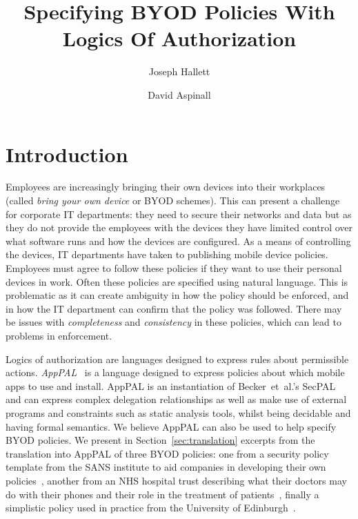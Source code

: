 \documentclass{easychair}
\title{Specifying BYOD Policies With Logics Of Authorization}
\author{
  Joseph Hallett\inst{1}
  \and
  David Aspinall\inst{1}
}
\institute{
  University of Edinburgh
}
\begin{document}
\maketitle

\begin{abstract}
\end{abstract}

\section{Introduction}

Employees are increasingly bringing their own devices into their workplaces (called \emph{bring your own device} or BYOD schemes).
This can present a challenge for corporate IT departments:
  they need to secure their networks and data but as they do not provide the employees with the devices they have limited control over what software runs and how the devices are configured.
As a means of controlling the devices, IT departments have taken to publishing mobile device policies.
Employees must agree to follow these policies if they want to use their personal devices in work.
Often these policies are specified using natural language.
This is problematic as it can create ambiguity in how the policy should be enforced, and in how the IT department can confirm that the policy was followed.
There may be issues with \emph{completeness} and \emph{consistency} in these policies, which can lead to problems in enforcement.

Logics of authorization are languages designed to express rules about permissible actions.
\emph{AppPAL}~\cite{Hallett:2016vu} is a language designed to express policies about which mobile apps to use and install.
AppPAL is an instantiation of Becker~et~al{.}'s SecPAL~\cite{Becker:2006vh} and can express complex delegation relationships as well as make use of external programs and constraints such as static analysis tools, whilst being decidable and having formal semantics.
We believe AppPAL can also be used to help specify BYOD policies. 
We present in Section~\ref{sec:translation} excerpts from the translation into AppPAL of three BYOD policies: one from a security policy template from the SANS institute to aid companies in developing their own policies~\cite{Guerin:2008we}, another from an NHS hospital trust describing what their doctors may do with their phones and their role in the treatment of patients~\cite{Kennington:2014tr}, finally a simplistic policy used in practice from the University of Edinburgh~\cite{Williamson:2015tr}.
\end{document}
